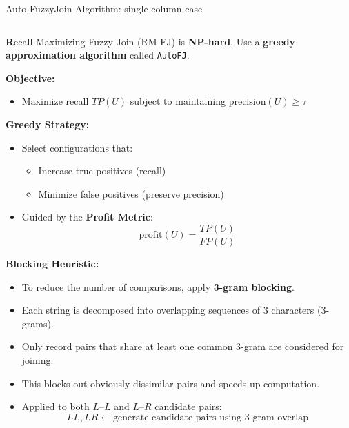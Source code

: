 \documentclass[8pt]{beamer} %
\begin{document}
\begin{frame}{Auto-FuzzyJoin Algorithm: single column case}
	\begin{columns}
		\begin{column}{0.55\textwidth}
			
			
			\textbf Recall-Maximizing Fuzzy Join (RM-FJ) is \textbf{NP-hard}. Use a \textbf{greedy approximation algorithm} called \texttt{AutoFJ}.
			
			\vspace{0.5em}
			\textbf{Objective:}
			\begin{itemize}
				\item Maximize recall $TP(U)$ subject to maintaining $\text{precision}(U) \geq \tau$
			\end{itemize}
			
			\textbf{Greedy Strategy:}
			\begin{itemize}
				\item Select configurations that:
				\begin{itemize}
					\item Increase true positives (recall)
					\item Minimize false positives (preserve precision)
				\end{itemize}
				\item Guided by the \textbf{Profit Metric}:
				$$
				\text{profit}(U) = \frac{TP(U)}{FP(U)}
				$$
			\end{itemize}
			
			\textbf{Blocking Heuristic:}
			\tiny
			\begin{itemize}
				\item To reduce the number of comparisons, apply \textbf{3-gram blocking}.
				\item Each string is decomposed into overlapping sequences of 3 characters (3-grams).
				\item Only record pairs that share at least one common 3-gram are considered for joining.
				\item This blocks out obviously dissimilar pairs and speeds up computation.
				\item Applied to both $L$–$L$ and $L$–$R$ candidate pairs:
				$$
				LL, LR \leftarrow \text{generate candidate pairs using 3-gram overlap}
				$$
			\end{itemize}

		\end{column}
		

\end{columns}
\end{frame}
\end{document}
